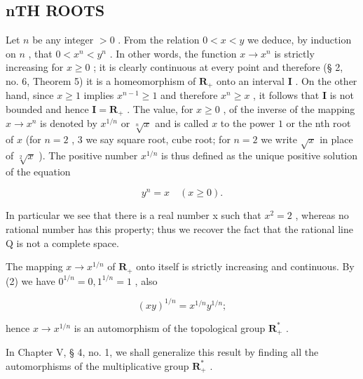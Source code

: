 \subsection{nTH ROOTS}

Let \(n\) be any integer \(> 0\) . From the relation \(0 < x < y\) we deduce, by induction on \(n\) , that \(0 < x^n < y^n\) . In other words, the function \(x \to x^n\) is strictly increasing for \(x \geqslant 0\) ; it is clearly continuous at every point and therefore (§ 2, no. 6, Theorem 5) it is a homeomorphism of \(\mathbf{R}_{+}\) onto an interval \(\mathbf{I}\) . On the other hand, since \(x \geqslant 1\) implies \(x^{n-1} \geqslant 1\) and therefore \(x^n \geqslant x\) , it follows that \(\mathbf{I}\) is not bounded and hence \(\mathbf{I} = \mathbf{R}_{+}\) . The value, for \(x \geqslant 0\) , of the inverse of the mapping \(x \to x^n\) is denoted by \(x^{1/n}\) or \(\sqrt[n]{x}\) and is called \(x\) to the power \(1\) or the nth root of \(x\) (for \(n = 2\) , 3 we say square root, cube root; for \(n = 2\) we write \(\sqrt{x}\) in place of \(\sqrt[2]{x}\) ). The positive number \(x^{1/n}\) is thus defined as the unique positive solution of the equation

\[
y ^ {n} = x \quad (x \geqslant 0).\tag{2}
\]

In particular we see that there is a real number x such that \(x^{2}=2\) , whereas no rational number has this property; thus we recover the fact that the rational line Q is not a complete space.

The mapping \(x \to x^{1/n}\) of \(\mathbf{R}_+\) onto itself is strictly increasing and continuous. By (2) we have \(0^{1/n}=0, 1^{1/n}=1\) , also

\[
(x y) ^ {1 / n} = x ^ {1 / n} y ^ {1 / n};\tag{3}
\]

hence \(x \to x^{1/n}\) is an automorphism of the topological group \(\mathbf{R}_{+}^{*}\) .

In Chapter V, § 4, no. 1, we shall generalize this result by finding all the automorphisms of the multiplicative group \(\mathbf{R}_{+}^{*}\) .

